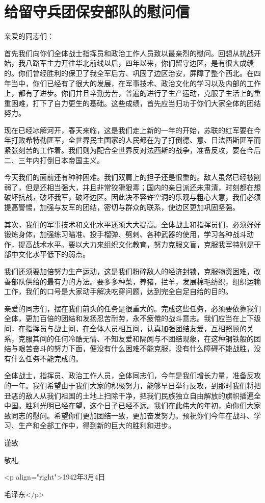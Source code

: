 \section[给留守兵团保安部队的慰问信（一九四二年三月四日）]{给留守兵团保安部队的慰问信}


亲爱的同志们：

首先我们向你们全体战士指挥员和政治工作人员致以最亲烈的慰问。回想从抗战开始，我八路军主力开往华北前线以后，四年以来，你们留守边区，是有很大成绩的。你们曾经胜利的保卫了我全军后方、巩固了边区治安，屏障了整个西北。在四年当中，你们已经有了很大的发展，在军事技术、政治文化的学习以及内部的工作上，都有了进步。你们并且辛勤劳苦，普遍的进行了生产运动，克服了生活上的重重困难，打下了自力更生的基础。这些成绩，首先应当归功于你们大家全体的团结努力。

现在已经冰解河开，春天来临，这是我们走上新的一年的开始，苏联的红军要在今年打败希特勒匪军，全世界民主国家的人民都在为了打倒德、意、日法西斯匪军而紧张刻苦的工作着。我们则为配合全世界反对法西斯的战争，准备反攻，要在今后二、三年内打倒日本帝国主义。


今天我们的面前还有种种困难。我们双肩上的担子还是很重的。敌人虽然已经被削弱了，但是还相当强大，并且非常狡猾狠毒；国内的亲日派还未肃清，时刻都在想破坏抗战，破坏我军，破坏边区。因此决不容许空洞的乐观与粗心大意，我们必须提高警惕，加强与友军的团结，密切与群众的联系，使边区更加巩固坚强。

其次，我们的军事技术和文化水平还须大大提高。全体战士和指挥员们，必须好好锻炼身体，加强练习瞄准、投手榴弹、劈刺、各种武器的使用，学习各种战斗动作，提高战术水平。要以大力来组织文化教育，努力克服文盲，克服我军特别是干部中文化水平低下的弱点。

我们还须要加倍努力生产运动，这是我们粉碎敌人的经济封锁，克服物资困难，改善部队供给的最有力的方法。要多多种菜，养猪，拦羊，发展棉毛纺织，组织运输工作，我们的口号是大家动手解决吃穿问题，达到完全自足自给的目的。

亲爱的同志们，摆在我们前头的任务是很重大的。完成这些任务，必须要依靠我们全体，更加百倍的团结和发扬忍苦耐劳，永不疲倦的战斗意志。我们应当在上下级间，在指挥员与战士间，在全体人员相互间，认真加强团结友爱，互相照顾的关系，克服其间的任何冷酷无情、不知友爱和隔阂与不团结现象，在这种钢铁般的团结与艰苦奋斗的努力下面，便没有什么困难不能克服，没有什么障碍不能战胜，没有什么任务不能完成的。

全体战士，指挥员、政治工作人员，全体同志们，今年是我们增长力量，准备反攻的一年。我们希望由于我们大家的积极努力，能够早日举行反攻，到那时我们将把丑恶的敌人从我们祖国的土地上扫除干净，把我们民族独立自由解放的旗帜插遍全中国。胜利光明已经在望，这个日子已经不远。我们在此伟大的年初，向你们大家致同志的慰问。希望你们更加团结一致，更加奋发努力。预祝你们今年在战斗、学习、生产和全部工作中，得到新的巨大的胜利和进步。

谨致

敬礼

<p align="right">1942年3月4日

毛泽东</p>

